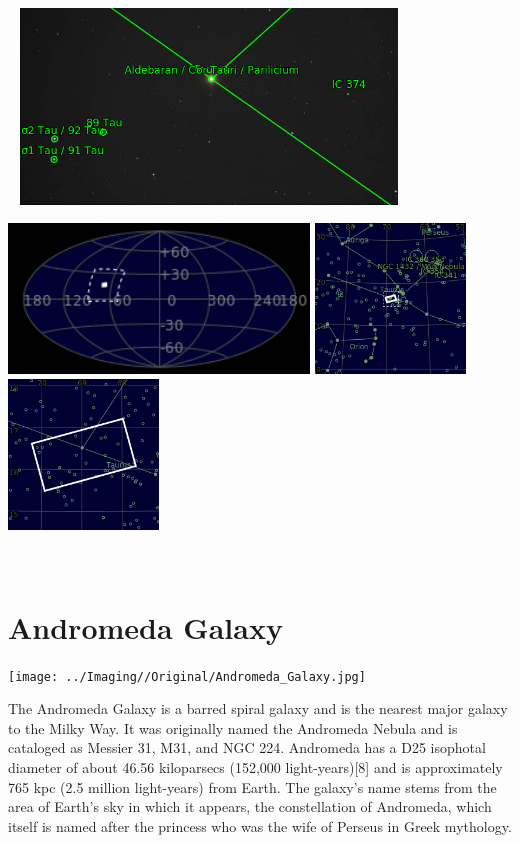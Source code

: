 \begin{center}
 \ \newpage
\includegraphics[width=0.75\textwidth]{../Imaging//Annotated/Aldebaran_Star_Annotated.jpg}

\includegraphics[height=4cm]{../Imaging//Annotated/Aldebaran_Star_Globe.jpg}
\includegraphics[height=4cm]{../Imaging//Annotated/Aldebaran_Star_Close.jpg}
\includegraphics[height=4cm]{../Imaging//Annotated/Aldebaran_Star_Closer.jpg}
\end{center}
\ \\\section{Andromeda Galaxy}
\texttt{[image: ../Imaging//Original/Andromeda\_Galaxy.jpg]}
{\footnotesize\color{white}
The Andromeda Galaxy is a barred spiral galaxy and is the nearest major galaxy to the Milky Way. It was originally named the Andromeda Nebula and is cataloged as Messier 31, M31, and NGC 224. Andromeda has a D25 isophotal diameter of about 46.56 kiloparsecs (152,000 light-years)[8] and is approximately 765 kpc (2.5 million light-years) from Earth. The galaxy's name stems from the area of Earth's sky in which it appears, the constellation of Andromeda, which itself is named after the princess who was the wife of Perseus in Greek mythology. 


}\ \\
